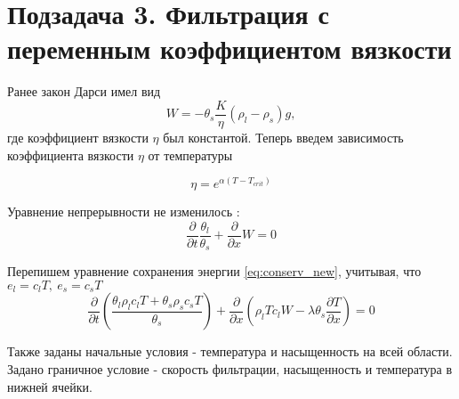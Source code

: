 \documentclass[12pt]{article}
\newcommand{\pd}[2]{\frac{\partial #1}{\partial #2}}
\begin{document}
\newpage
\section*{Подзадача 3. Фильтрация с переменным коэффициентом вязкости}

Ранее закон Дарси имел вид 
$$
W= -\theta_s \frac{K}{\eta}(\rho_l-\rho_s)g,
$$
где коэффициент вязкости $\eta $ был константой. Теперь введем зависимость коэффициента вязкости 	$ \eta $ от температуры

\begin{equation}
\eta = e^{\alpha(T - T_{crit})}
\label{viscos}
\end{equation}

Уравнение непрерывности не изменилось :
$$
\pd{}{t}\frac{\theta_l}{\theta_s} + \pd{}{x}W = 0
$$

Перепишем уравнение сохранения энергии \eqref{eq:conserv_new}, учитывая, что $ e_l = c_lT,\ e_s = c_sT $ 
\begin{equation}
\pd{}{t} \left(\frac{\theta_l \rho_l c_l T + \theta_s \rho_s c_s T}{\theta_s}\right) + \pd{}{x}\left(\rho_l T c_l W - \lambda \theta_s \pd{T}{x}\right) = 0
\label{conserv}
\end{equation}

Также заданы начальные условия -  температура и насыщенность на всей области. Задано граничное условие - скорость фильтрации, насыщенность и температура в нижней ячейки.
\end{document}
